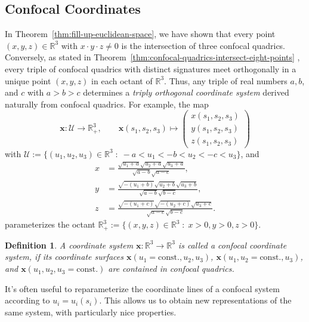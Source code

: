 \documentclass[10pt, a4paper]{article}
\theoremstyle{BoldTopSpacing}
\theoremstyle{BoldTopSpacing}
\theoremstyle{BoldTopSpacing}
\theoremstyle{BoldTopBottomSpacing}
\newtheorem{definition}{Definition}[section]
\theoremstyle{BoldTopSpacing}
\theoremstyle{BoldTopBottomSpacing}
\theoremstyle{remark}
\begin{document}
\subsection{Confocal Coordinates}
\label{subsec:confocal-coordinates}
In Theorem~\ref{thm:fill-up-euclidean-space}, we have shown that every point $(x, y, z) \in \mathbb{R}^3$ with $x \cdot y \cdot z \neq 0$ is the intersection of three confocal quadrics. Conversely, as stated in Theorem~\ref{thm:confocal-quadrics-intersect-eight-points}
, every triple of confocal quadrics with distinct signatures meet orthogonally in a unique point $(x, y, z)$ in each octant of $\mathbb{R}^3$. Thus, any triple of real numbers $a, b$, and $c$ with $a > b > c$ determines a \textit{triply orthogonal coordinate system} derived naturally from confocal quadrics. For example, the map
\[
\boldsymbol{x} :  \mathcal{U} \to \mathbb{R}_{+}^3, \quad \quad \boldsymbol{x}(s_{1}, s_{2}, s_{3}) \mapsto \begin{pmatrix}
x(s_{1}, s_{2}, s_{3}) \\
y(s_{1}, s_{2}, s_{3}) \\
z(s_{1}, s_{2}, s_{3})
\end{pmatrix}
\]
with $\mathcal{U} := \{ (u_{1}, u_{2}, u_{3}) \in \mathbb{R}^3 \; : \; -a < u_{1} < -b < u_{2} < -c < u_{3}\}$, and
\begin{align*}
x &= \frac{\sqrt{u_{1} + a}\sqrt{u_{2} + a}\sqrt{u_{3} + a }}{\sqrt{a-b}\sqrt{a-c}}, \\
y &= \frac{\sqrt{-(u_{1} + b)}\sqrt{u_{2} + b}\sqrt{u_{3} + b}}{\sqrt{a-b}\sqrt{b-c}}, \\
z &= \frac{\sqrt{-(u_{1} + c)}\sqrt{-(u_{2} + c)}\sqrt{u_{3} + c}}{\sqrt{a-c}\sqrt{b-c}}.
\end{align*}
parameterizes the octant $\mathbb{R}_{+}^3 := \{ (x, y, z)\in \mathbb{R}^3 \; : \; x > 0, y > 0, z > 0 \}$.

\begin{definition}
\label{def:confocal-coordinates}
A coordinate system $\boldsymbol{x} : \mathbb{R}^3 \to \mathbb{R}^3$ is called a \textit{confocal coordinate system}, if its coordinate surfaces $\boldsymbol{x}(u_{1}=\text{const.}, u_{2}, u_{3})$, $\boldsymbol{x}(u_{1}, u_{2}=\text{const.}, u_{3})$, and $\boldsymbol{x}(u_{1}, u_{2}, u_{3}=\text{const.})$ are contained in confocal quadrics.
\end{definition}

It's often useful to reparameterize the coordinate lines of a confocal system according to $u_{i} = u_{i}(s_{i})$. This allows us to obtain new representations of the same system, with particularly nice properties.
\end{document}
